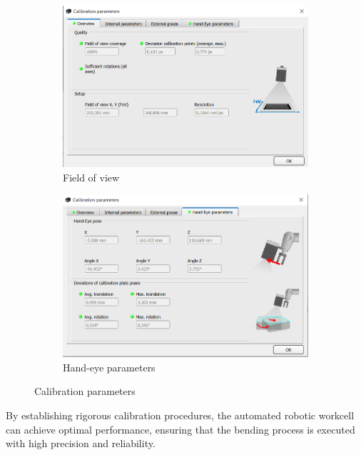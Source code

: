 \begin{figure}[h]
\begin{subfigure}{0.48\textwidth}
        \includegraphics[width=\textwidth]{figures/001calibration/fov.PNG}
        \caption{Field of view}
        \label{subfig:fov}
    \end{subfigure}
    \begin{subfigure}{0.48\textwidth}
        \centering
        \includegraphics[width=\textwidth]{figures/001calibration/hand-eye_parameters.PNG}
        \caption{Hand-eye parameters}
        \label{subfig:hand-eye-parameters}
    \end{subfigure}
    \caption{Calibration parameters}
    \label{fig:calibration-parameters}
\end{figure}


By establishing rigorous calibration procedures, the automated robotic workcell can achieve optimal performance, ensuring that the bending process is executed with high precision and reliability.
